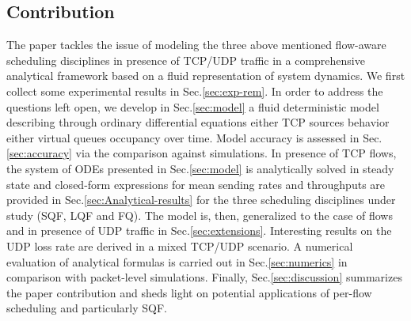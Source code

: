 \documentclass[a4paper,oneside, 11pt]{article}
\begin{document}
\subsection{Contribution}
The paper tackles the issue of modeling the three above mentioned
flow-aware scheduling disciplines in presence of TCP/UDP traffic in a comprehensive
analytical framework based on a fluid representation of system dynamics.
We first collect some experimental results in Sec.\ref{sec:exp-rem}.
In order to address the questions left open,
we develop in Sec.\ref{sec:model} a fluid deterministic model
describing through ordinary differential equations either TCP sources behavior either virtual
queues occupancy over time.
Model accuracy is assessed in Sec.\ref{sec:accuracy} via the comparison against  simulations.
In presence of  TCP flows, the system of ODEs presented in Sec.\ref{sec:model} is
analytically solved in steady state and
closed-form expressions for mean sending rates and throughputs are provided in Sec.\ref{sec:Analytical-results}
for the three scheduling disciplines under study (SQF, LQF and FQ).
The model is, then, generalized to the case of  flows and
in presence of UDP traffic in Sec.\ref{sec:extensions}.
Interesting results on the UDP loss rate are derived in a mixed TCP/UDP scenario.
A numerical evaluation of analytical formulas  is carried out in Sec.\ref{sec:numerics} in comparison with packet-level simulations.
Finally, Sec.\ref{sec:discussion} summarizes the paper contribution and sheds light on potential applications of per-flow scheduling and
particularly SQF.
\end{document}
